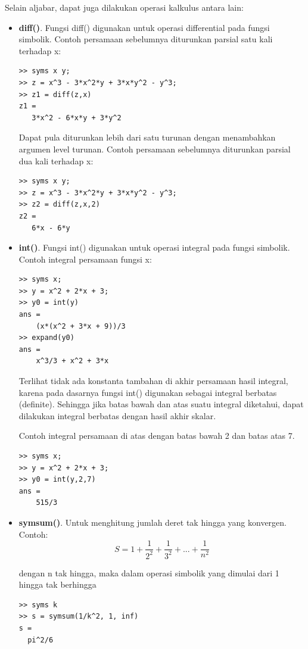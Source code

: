 \documentclass[12pt]{book}
\begin{document}
	Selain aljabar, dapat juga dilakukan operasi kalkulus antara lain:
	\begin{itemize}
		\item \textbf{diff()}. Fungsi diff() digunakan untuk operasi differential pada fungsi simbolik.
		Contoh persamaan sebelumnya diturunkan parsial satu kali terhadap x:
		\begin{verbatim}
>> syms x y;
>> z = x^3 - 3*x^2*y + 3*x*y^2 - y^3;
>> z1 = diff(z,x)
z1 =
   3*x^2 - 6*x*y + 3*y^2
		\end{verbatim}
	
		Dapat pula diturunkan lebih dari satu turunan dengan menambahkan argumen level turunan.
		Contoh persamaan sebelumnya diturunkan parsial dua kali terhadap x:
		\begin{verbatim}
>> syms x y;
>> z = x^3 - 3*x^2*y + 3*x*y^2 - y^3;
>> z2 = diff(z,x,2)
z2 =
   6*x - 6*y
		\end{verbatim}
	
		\item \textbf{int()}. Fungsi int() digunakan untuk operasi integral pada fungsi simbolik.
		Contoh integral persamaan fungsi x:
		\begin{verbatim}
>> syms x;
>> y = x^2 + 2*x + 3;
>> y0 = int(y)
ans =
    (x*(x^2 + 3*x + 9))/3
>> expand(y0)
ans =
    x^3/3 + x^2 + 3*x
		\end{verbatim}
	
		Terlihat tidak ada konstanta tambahan di akhir persamaan hasil integral, karena pada dasarnya fungsi int() digunakan sebagai integral berbatas (definite).
		Sehingga jika batas bawah dan atas suatu integral diketahui, dapat dilakukan integral berbatas dengan hasil akhir skalar.
		
		Contoh integral persamaan di atas dengan batas bawah 2 dan batas atas 7.
		\begin{verbatim}
>> syms x;
>> y = x^2 + 2*x + 3;
>> y0 = int(y,2,7)
ans =
    515/3
		\end{verbatim}

		\item \textbf{symsum()}. Untuk menghitung jumlah deret tak hingga yang konvergen.
		Contoh:
		\[ S = 1 + \frac{1}{2^2} + \frac{1}{3^2} + ... + \frac{1}{n^2}\]
		
		dengan n tak hingga, maka dalam operasi simbolik yang dimulai dari 1 hingga tak berhingga
		\begin{verbatim}
>> syms k
>> s = symsum(1/k^2, 1, inf)
s = 
  pi^2/6
		\end{verbatim}
	

\end{itemize}
\end{document}
